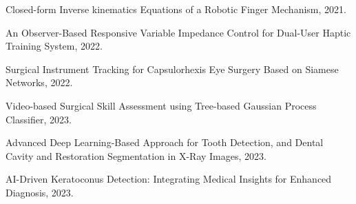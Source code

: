 \documentclass[11pt,a4paper,sans]{moderncv} %
\begin{document}
    
    \href{https://ieeexplore.ieee.org/abstract/document/9663448/}{\textcolor{gray}{\faCloudDownload} }Closed-form Inverse kinematics Equations of a Robotic Finger Mechanism, 2021.
 
    
    \href{https://ieeexplore.ieee.org/abstract/document/9981977/}{\textcolor{gray}{\faCloudDownload} }An Observer-Based Responsive Variable Impedance Control for Dual-User Haptic Training System, 2022.

    \href{https://ieeexplore.ieee.org/abstract/document/10025355/}{\textcolor{gray}{\faCloudDownload} }Surgical Instrument Tracking for Capsulorhexis Eye Surgery Based on Siamese Networks, 2022.
 
    \href{https://arxiv.org/abs/2312.10208}{\textcolor{gray}{\faCloudDownload} }Video-based Surgical Skill Assessment using Tree-based Gaussian Process Classifier, 2023.


    \href{https://ieeexplore.ieee.org/abstract/document/10412537/}{\textcolor{gray}{\faCloudDownload} }Advanced Deep Learning-Based Approach for Tooth Detection, and Dental Cavity and Restoration Segmentation in X-Ray Images, 2023.
 
    \href{https://ieeexplore.ieee.org/abstract/document/10412506/}{\textcolor{gray}{\faCloudDownload} }AI-Driven Keratoconus Detection: Integrating Medical Insights for Enhanced Diagnosis, 2023.	
 
\end{document}
